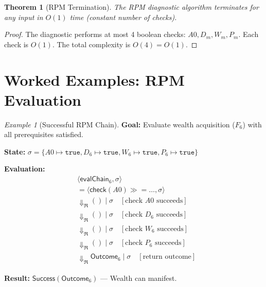 \documentclass[11pt,twoside,openright]{book}
\theoremstyle{definition}
\theoremstyle{plain}
\newtheorem{theorem}[definition]{Theorem}
\theoremstyle{remark}
\newtheorem{example}[definition]{Example}
\newcommand{\RPM}{\mathfrak{R}}
\newcommand{\rpmbind}{\mathbin{\gg\!=}}
\newcommand{\bigstep}{\Downarrow}
\begin{document}
\begin{theorem}[RPM Termination]
\label{thm:rpm-term}
The RPM diagnostic algorithm terminates for any input in $O(1)$ time (constant number of checks).
\end{theorem}

\begin{proof}
The diagnostic performs at most 4 boolean checks: $A0, D_m, W_m, P_m$. Each check is $O(1)$. The total complexity is $O(4) = O(1)$.
\end{proof}

\section{Worked Examples: RPM Evaluation}

\begin{example}[Successful RPM Chain]
\label{ex:rpm-success}
\textbf{Goal:} Evaluate wealth acquisition ($F_6$) with all prerequisites satisfied.

\textbf{State:} $\sigma = \{A0 \mapsto \mathtt{true}, D_6 \mapsto \mathtt{true}, W_6 \mapsto \mathtt{true}, P_6 \mapsto \mathtt{true}\}$

\textbf{Evaluation:}
\begin{align}
&\langle \mathsf{evalChain}_6, \sigma \rangle \\
&= \langle \mathsf{check}(A0) \rpmbind \ldots, \sigma \rangle \\
&\bigstep_\RPM () \mid \sigma \quad [\text{check } A0 \text{ succeeds}] \\
&\bigstep_\RPM () \mid \sigma \quad [\text{check } D_6 \text{ succeeds}] \\
&\bigstep_\RPM () \mid \sigma \quad [\text{check } W_6 \text{ succeeds}] \\
&\bigstep_\RPM () \mid \sigma \quad [\text{check } P_6 \text{ succeeds}] \\
&\bigstep_\RPM \mathsf{Outcome}_6 \mid \sigma \quad [\text{return outcome}]
\end{align}

\textbf{Result:} $\mathsf{Success}(\mathsf{Outcome}_6)$ --- Wealth can manifest.
\end{example}
\end{document}
